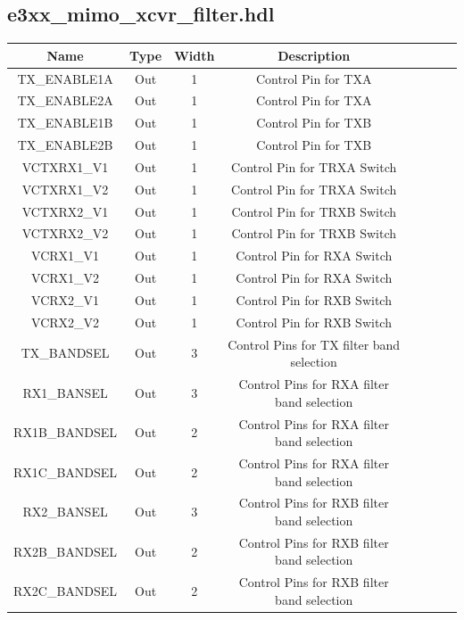 \documentclass{article}
\def\comp{e3xx\_mimo\_xcvr\_filter}
\def\comp{e3xx\_mimo\_xcvr\_filter}
\begin{document}
\begin{landscape}
\subsection*{\comp.hdl}
		\begin{scriptsize}
			\begin{tabular}{|c|c|c|c|p{2.6cm}|c|c|c|}
			\hline
			\rowcolor{blue}
			Name & Type  & Width & Description \\
			\hline
			TX\_ENABLE1A  & Out & 1     & Control Pin for TXA    \\
			\hline
			TX\_ENABLE2A  & Out & 1     & Control Pin for TXA    \\
			\hline
			TX\_ENABLE1B  & Out & 1     & Control Pin for TXB    \\
			\hline
			TX\_ENABLE2B  & Out & 1     & Control Pin for TXB    \\
			\hline
			VCTXRX1\_V1   & Out & 1     & Control Pin for TRXA Switch   \\
			\hline
			VCTXRX1\_V2   & Out & 1     & Control Pin for TRXA Switch   \\
			\hline
			VCTXRX2\_V1   & Out & 1     & Control Pin for TRXB Switch   \\
			\hline
			VCTXRX2\_V2   & Out & 1     & Control Pin for TRXB Switch   \\
			\hline
			VCRX1\_V1   & Out & 1     & Control Pin for RXA Switch   \\
			\hline
			VCRX1\_V2   & Out & 1     & Control Pin for RXA Switch   \\
			\hline
			VCRX2\_V1   & Out & 1     & Control Pin for RXB Switch   \\
			\hline
			VCRX2\_V2   & Out & 1     & Control Pin for RXB Switch   \\
			\hline
			TX\_BANDSEL   & Out & 3     & Control Pins for TX filter band selection   \\
			\hline
			RX1\_BANSEL     & Out & 3     & Control Pins for RXA filter band selection   \\
			\hline
			RX1B\_BANDSEL   & Out & 2     & Control Pins for RXA filter band selection   \\
			\hline
			RX1C\_BANDSEL   & Out & 2     & Control Pins for RXA filter band selection   \\
			\hline
			RX2\_BANSEL     & Out & 3     & Control Pins for RXB filter band selection   \\
			\hline
			RX2B\_BANDSEL   & Out & 2     & Control Pins for RXB filter band selection   \\
			\hline
			RX2C\_BANDSEL   & Out & 2     & Control Pins for RXB filter band selection   \\

\end{tabular}
\end{scriptsize}
\end{landscape}
\end{document}

